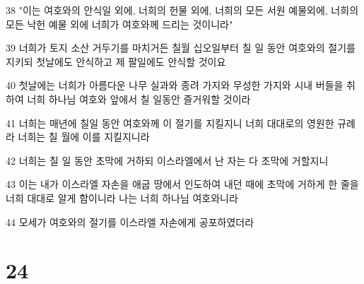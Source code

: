 \par 38 "이는 여호와의 안식일 외에, 너희의 헌물 외에, 너희의 모든 서원 예물외에, 너희의 모든 낙헌 예물 외에 너희가 여호와께 드리는 것이니라"
\par 39 너희가 토지 소산 거두기를 마치거든 칠월 십오일부터 칠 일 동안 여호와의 절기를 지키되 첫날에도 안식하고 제 팔일에도 안식할 것이요
\par 40 첫날에는 너희가 아름다운 나무 실과와 종려 가지와 무성한 가지와 시내 버들을 취하여 너희 하나님 여호와 앞에서 칠 일동안 즐거워할 것이라
\par 41 너희는 매년에 칠일 동안 여호와께 이 절기를 지킬지니 너희 대대로의 영원한 규례라 너희는 칠 월에 이를 지킬지니라
\par 42 너희는 칠 일 동안 초막에 거하되 이스라엘에서 난 자는 다 초막에 거할지니
\par 43 이는 내가 이스라엘 자손을 애굽 땅에서 인도하여 내던 때에 초막에 거하게 한 줄을 너희 대대로 알게 함이니라 나는 너희 하나님 여호와니라
\par 44 모세가 여호와의 절기를 이스라엘 자손에게 공포하였더라

\chapter{24}


